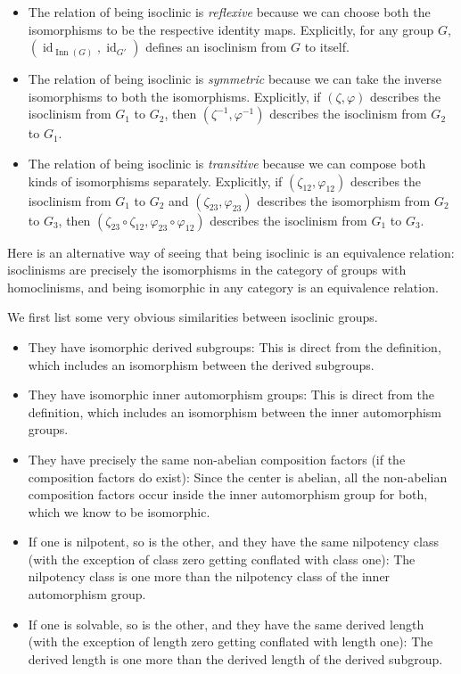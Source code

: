 \begin{itemize}
\item The relation of being isoclinic is {\em reflexive} because we
  can choose both the isomorphisms to be the respective identity
  maps. Explicitly, for any group $G$,
  $(\operatorname{id}_{\operatorname{Inn}(G)},\operatorname{id}_{G'})$
  defines an isoclinism from $G$ to itself.
\item The relation of being isoclinic is {\em symmetric} because we
  can take the inverse isomorphisms to both the
  isomorphisms. Explicitly, if $(\zeta,\varphi)$ describes the
  isoclinism from $G_1$ to $G_2$, then $(\zeta^{-1},\varphi^{-1})$
  describes the isoclinism from $G_2$ to $G_1$.
\item The relation of being isoclinic is {\em transitive} because we
  can compose both kinds of isomorphisms separately. Explicitly, if
  $(\zeta_{12},\varphi_{12})$ describes the isoclinism from $G_1$ to
  $G_2$ and $(\zeta_{23},\varphi_{23})$ describes the isomorphism from
  $G_2$ to $G_3$, then $(\zeta_{23} \circ \zeta_{12}, \varphi_{23}
  \circ \varphi_{12})$ describes the isoclinism from $G_1$ to $G_3$.
\end{itemize}

Here is an alternative way of seeing that being isoclinic is an
equivalence relation: isoclinisms are precisely the isomorphisms in
the category of groups with homoclinisms, and being isomorphic in any
category is an equivalence relation.

We first list some very obvious similarities between isoclinic groups.

\begin{itemize}
\item They have isomorphic derived subgroups: This is direct from the
  definition, which includes an isomorphism between the derived
  subgroups.
\item They have isomorphic inner automorphism groups: This is direct
  from the definition, which includes an isomorphism between the inner
  automorphism groups.
\item They have precisely the same non-abelian composition factors (if
  the composition factors do exist): Since the center is abelian, all
  the non-abelian composition factors occur inside the inner
  automorphism group for both, which we know to be isomorphic.
\item If one is nilpotent, so is the other, and they have the same
  nilpotency class (with the exception of class zero getting conflated
  with class one): The nilpotency class is one more than the
  nilpotency class of the inner automorphism group.
\item If one is solvable, so is the other, and they have the same
  derived length (with the exception of length zero getting conflated
  with length one): The derived length is one more than the derived
  length of the derived subgroup.
\end{itemize}

